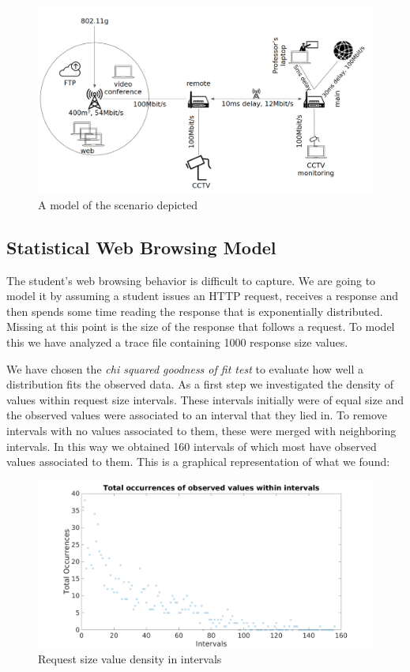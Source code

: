 \documentclass[a4paper]{scrreprt}
\begin{document}
		\begin{figure}[H]
		\includegraphics[width=\textwidth]{./simmodel.png}
		\caption{A model of the scenario depicted}
		\end{figure}
	\subsection{Statistical Web Browsing Model}
		The student's web browsing behavior is difficult to capture. We are going to model it by assuming a student issues an HTTP request, receives a response and then spends some time reading the response that is exponentially distributed. Missing at this point is the size of the response that follows a request. To model this we have analyzed a trace file containing 1000 response size values.
		
		We have chosen the \emph{chi squared goodness of fit test} to evaluate how well a distribution fits the observed data. As a first step we investigated the density of values within request size intervals. These intervals initially were of equal size and the observed values were associated to an interval that they lied in. To remove intervals with no values associated to them, these were merged with neighboring intervals. In this way we obtained 160 intervals of which most have observed values associated to them. This is a graphical representation of what we found:
		\begin{figure}[H]
		\includegraphics[width=\textwidth]{../tracefile_analysis/exp.png}
		\caption{Request size value density in intervals}
		\end{figure}
		
\end{document}
